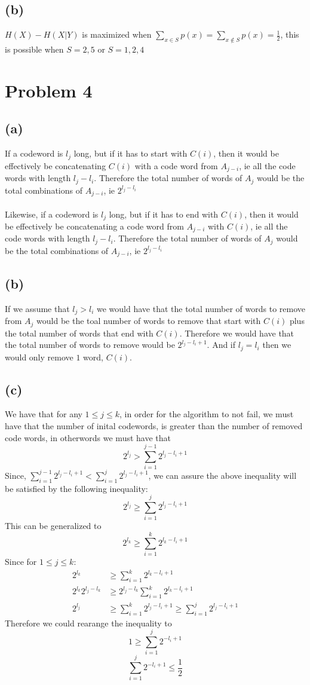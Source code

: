 \subsection*{(b)}
$H(X)-H(X|Y)$ is maximized when 
$\sum_{x\in S}p(x)=\sum_{x\notin S}p(x)=\frac{1}{2}$, this is possible
when $S=\boxed{2,5}$ or $S=\boxed{1,2,4}$
\section*{Problem 4}
\subsection*{(a)}
If a codeword is $l_j$ long, but if it has to start with $C(i)$, then it would be effectively be
concatenating $C(i)$ with a code word from $A_{j-i}$, ie all the code words with length $l_j-l_i$. Therefore the total number of words 
of $A_j$ would be the total combinations of $A_{j-i}$, ie $2^{l_j-l_i}$\\\\
Likewise, if a codeword is $l_j$ long, but if it has to end with $C(i)$, then it would be effectively be
concatenating a code word from $A_{j-i}$ with $C(i)$, ie all the code words with length $l_j-l_i$. Therefore the total number of words 
of $A_j$ would be the total combinations of $A_{j-i}$, ie $2^{l_j-l_i}$
\subsection*{(b)}
If we assume that $l_j>l_i$ we would have that the total number of words to remove from $A_j$ would
be the toal number of words to remove that start with $C(i)$ plus the total number of words that end with
$C(i)$. Therefore we would have that the total number of words to remove would be $2^{l_j-l_i+1}$. 
And if $l_j=l_i$ then we would only remove $1$ word, $C(i)$.
\subsection*{(c)}
We have that for any $1\leq j\leq k$, in order for the algorithm to not fail, we must
have that the number of inital codewords, is greater than the number
of removed code words, in otherwords we must have that
$$2^{l_j}>\sum_{i=1}^{j-1}2^{l_j-l_i+1}$$
Since, $\sum_{i=1}^{j-1}2^{l_j-l_i+1}<\sum_{i=1}^{j}2^{l_j-l_i+1}$, we can
assure the above inequality will be satisfied by the following inequality:
$$2^{l_j}\geq\sum_{i=1}^j2^{l_j-l_i+1}$$
This can be generalized to 
$$2^{l_k}\geq\sum_{i=1}^k2^{l_k-l_i+1}$$
Since for $1\leq j \leq k$:
\begin{align*}
	2^{l_k}&\geq\sum_{i=1}^k2^{l_k-l_i+1}\\
	2^{l_k}2^{l_j-l_k}&\geq2^{l_j-l_k}\sum_{i=1}^k2^{l_k-l_i+1}\\
	2^{l_j}&\geq\sum_{i=1}^k2^{l_j-l_i+1}\geq \sum_{i=1}^j2^{l_j-l_i+1}
\end{align*}
Therefore we could rearange the inequality to 
$$1\geq\sum_{i=1}^j2^{-l_i+1}$$
$$\sum_{i=1}^j2^{-l_i+1}\leq\frac{1}{2}$$
